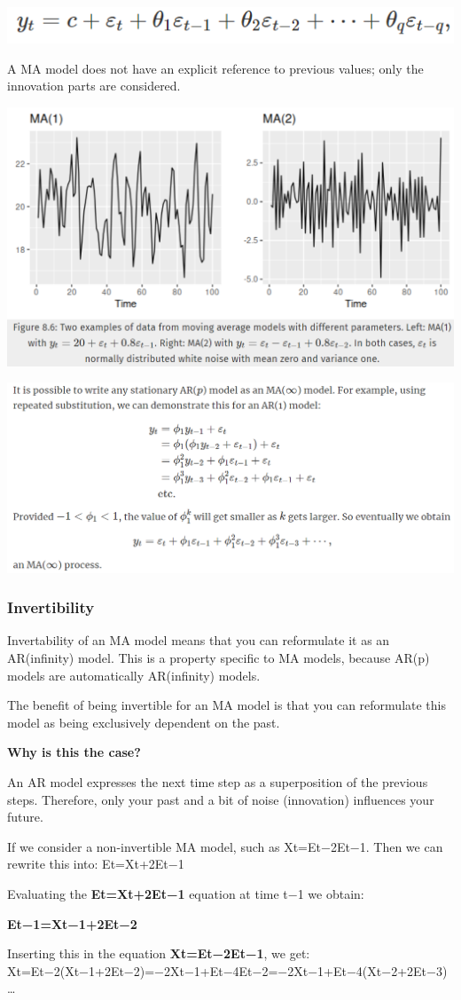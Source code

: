 \documentclass[
]{article}
\begin{document}
\includegraphics[width=0.5\linewidth]{ma}

A MA model does not have an explicit reference to previous values; only
the innovation parts are considered.

\includegraphics[width=0.5\linewidth]{ma1}

\includegraphics[width=0.5\linewidth]{ma2}

\hypertarget{invertibility}{%
\subsubsection{Invertibility}\label{invertibility}}

Invertability of an MA model means that you can reformulate it as an
AR(infinity) model. This is a property specific to MA models, because
AR(p) models are automatically AR(infinity) models.

The benefit of being invertible for an MA model is that you can
reformulate this model as being exclusively dependent on the past.

\textbf{Why is this the case?}

An AR model expresses the next time step as a superposition of the
previous steps. Therefore, only your past and a bit of noise
(innovation) influences your future.

If we consider a non-invertible MA model, such as Xt=Et−2Et−1. Then we
can rewrite this into: Et=Xt+2Et−1

Evaluating the \textbf{Et=Xt+2Et−1} equation at time t−1 we obtain:

\textbf{Et−1=Xt−1+2Et−2}

Inserting this in the equation \textbf{Xt=Et−2Et−1}, we get:
Xt=Et−2(Xt−1+2Et−2)=−2Xt−1+Et−4Et−2=−2Xt−1+Et−4(Xt−2+2Et−3)\ldots{}
\end{document}

